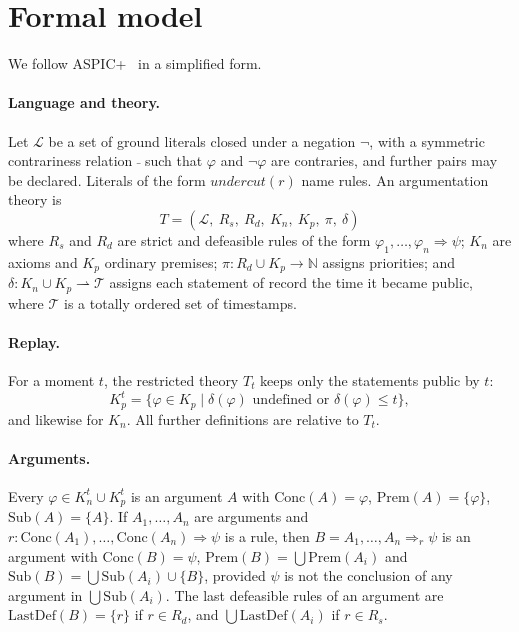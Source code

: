 \documentclass[11pt]{article}
\newcommand{\Prem}{\mathrm{Prem}}
\newcommand{\Conc}{\mathrm{Conc}}
\newcommand{\Sub}{\mathrm{Sub}}
\newcommand{\Last}{\mathrm{LastDef}}
\begin{document}
\section{Formal model}
\label{sec:model}

We follow ASPIC+~\cite{aspic} in a simplified form.

\paragraph{Language and theory.}
Let $\mathcal{L}$ be a set of ground literals closed under a negation
$\neg$, with a symmetric contrariness relation $\bar{\ }$ such that
$\varphi$ and $\neg\varphi$ are contraries, and further pairs may be
declared. Literals of the form $\mathit{undercut}(r)$ name rules. An
argumentation theory is
\[
  T = (\mathcal{L},\ R_s,\ R_d,\ K_n,\ K_p,\ \pi,\ \delta)
\]
where $R_s$ and $R_d$ are strict and defeasible rules of the form
$\varphi_1,\dots,\varphi_n \Rightarrow \psi$; $K_n$ are axioms and $K_p$
ordinary premises; $\pi : R_d \cup K_p \to \mathbb{N}$ assigns
priorities; and $\delta : K_n \cup K_p \rightharpoonup \mathcal{T}$
assigns each statement of record the time it became public, where
$\mathcal{T}$ is a totally ordered set of timestamps.

\paragraph{Replay.}
For a moment $t$, the restricted theory $T_t$ keeps only the
statements public by $t$:
\[
  K_p^t = \{\varphi \in K_p \mid \delta(\varphi) \text{ undefined or } \delta(\varphi) \le t\},
\]
and likewise for $K_n$. All further definitions are relative to $T_t$.

\paragraph{Arguments.}
Every $\varphi \in K_n^t \cup K_p^t$ is an argument $A$ with
$\Conc(A)=\varphi$, $\Prem(A)=\{\varphi\}$, $\Sub(A)=\{A\}$. If
$A_1,\dots,A_n$ are arguments and $r : \Conc(A_1),\dots,\Conc(A_n)
\Rightarrow \psi$ is a rule, then $B = A_1,\dots,A_n \Rightarrow_r \psi$
is an argument with $\Conc(B)=\psi$, $\Prem(B)=\bigcup \Prem(A_i)$ and
$\Sub(B)=\bigcup\Sub(A_i)\cup\{B\}$, provided $\psi$ is not the
conclusion of any argument in $\bigcup\Sub(A_i)$. The last defeasible
rules of an argument are $\Last(B)=\{r\}$ if $r\in R_d$, and
$\bigcup\Last(A_i)$ if $r \in R_s$.
\end{document}
